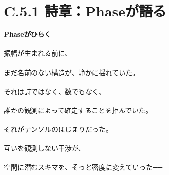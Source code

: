 
\section*{C.5.1 詩章：Phaseが語る}

\begin{flushleft}
\textbf{Phaseがひらく}\\\\

振幅が生まれる前に、\\\\
まだ名前のない構造が、静かに揺れていた。\\\\

それは詩ではなく、数でもなく、\\\\
誰かの観測によって確定することを拒んでいた。\\\\

それがテンソルのはじまりだった。\\\\
互いを観測しない干渉が、\\\\
空間に潜むスキマを、そっと密度に変えていった──\\\\
\end{flushleft}




